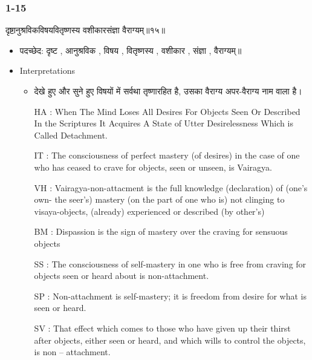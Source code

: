 \begin{frame}[fragile]\frametitle{1-15}
\begin{sanskrit}
दृष्टानुश्रविकविषयवितृष्णस्य वशीकारसंज्ञा वैराग्यम्॥१५॥
\end{sanskrit}

	\begin{itemize}
	\item पदच्छेद: दृष्ट , आनुश्रविक , विषय , वितृष्णस्य , वशीकार , संज्ञा , वैराग्यम्॥
	\item Interpretations
		\begin{itemize}		
		\item देखे हुए और सुने हुए विषयों में सर्वथा तृष्णारहित है, उसका वैराग्य अपर-वैराग्य नाम वाला है।
		\item [HA]: When The Mind Loses All Desires For Objects Seen Or Described In the Scriptures It Acquires A State of Utter Desirelessness Which is Called Detachment.
		\item [IT]: The consciousness of perfect mastery (of desires) in the case of one who has ceased to crave for objects, seen or unseen, is Vairagya.
		\item [VH]: Vairagya-non-attacment is the full knowledge (declaration) of (one’s own- the seer’s) mastery (on the part of one who is) not clinging to visaya-objects, (already) experienced or described (by other’s)
		\item [BM]: Dispassion is the sign of mastery over the craving for sensuous objects
		\item [SS]: The consciousness of self-mastery in one who is free from craving for objects seen or heard about is non-attachment.
		\item [SP]: Non-attachment is self-mastery; it is freedom from desire for what is seen or heard.
		\item [SV]: That effect which comes to those who have given up their thirst after objects, either seen or heard, and which wills to control the objects, is non – attachment. 
		\end{itemize}
	\end{itemize}
	
\end{frame}


